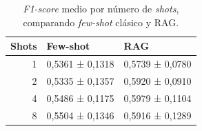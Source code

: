 \begin{table}[htbp]
\centering
\caption[F1-score medio por número de shots, comparando few-shot clásico y RAG]{\textit{F1-score} medio por número de \textit{shots}, comparando \textit{few-shot} clásico y RAG.}
\label{tab:fewshot_vs_rag}
\begin{tabular}{rll}
\toprule
Shots & Few-shot & RAG \\
\midrule
1 & 0{,}5361 ± 0{,}1318 & 0{,}5739 ± 0{,}0780 \\
2 & 0{,}5335 ± 0{,}1357 & 0{,}5920 ± 0{,}0910 \\
4 & 0{,}5486 ± 0{,}1175 & 0{,}5979 ± 0{,}1104 \\
8 & 0{,}5504 ± 0{,}1346 & 0{,}5916 ± 0{,}1289 \\
\bottomrule
\end{tabular}
\end{table}
